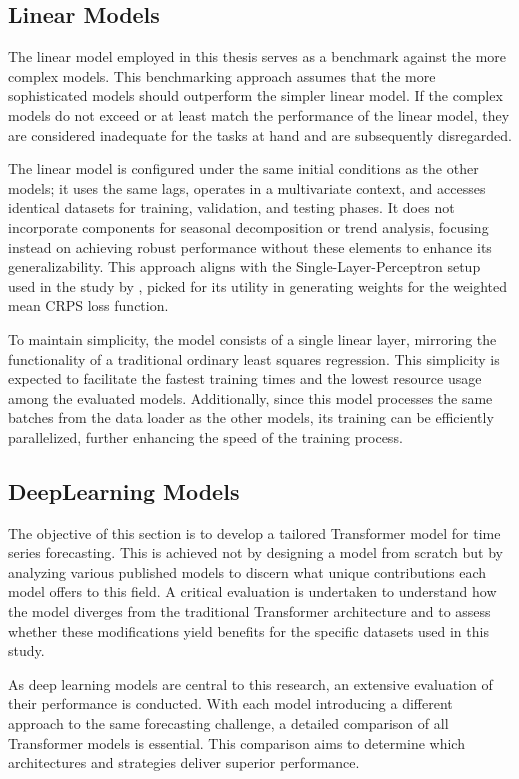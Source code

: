 \documentclass{article}
\begin{document}
\subsection{Linear Models}

The linear model employed in this thesis serves as a benchmark against the more complex models. This benchmarking approach assumes that the more sophisticated models should outperform the simpler linear model. If the complex models do not exceed or at least match the performance of the linear model, they are considered inadequate for the tasks at hand and are subsequently disregarded.

The linear model is configured under the same initial conditions as the other models; it uses the same lags, operates in a multivariate context, and accesses identical datasets for training, validation, and testing phases. It does not incorporate components for seasonal decomposition or trend analysis, focusing instead on achieving robust performance without these elements to enhance its generalizability. This approach aligns with the Single-Layer-Perceptron setup used in the study by \cite{transformers-effectiveness}, picked for its utility in generating weights for the weighted mean CRPS loss function.

To maintain simplicity, the model consists of a single linear layer, mirroring the functionality of a traditional ordinary least squares regression. This simplicity is expected to facilitate the fastest training times and the lowest resource usage among the evaluated models. Additionally, since this model processes the same batches from the data loader as the other models, its training can be efficiently parallelized, further enhancing the speed of the training process.


\subsection{DeepLearning Models}

The objective of this section is to develop a tailored Transformer model for time series forecasting. This is achieved not by designing a model from scratch but by analyzing various published models to discern what unique contributions each model offers to this field. A critical evaluation is undertaken to understand how the model diverges from the traditional Transformer architecture and to assess whether these modifications yield benefits for the specific datasets used in this study.

As deep learning models are central to this research, an extensive evaluation of their performance is conducted. With each model introducing a different approach to the same forecasting challenge, a detailed comparison of all Transformer models is essential. This comparison aims to determine which architectures and strategies deliver superior performance.
\end{document}
